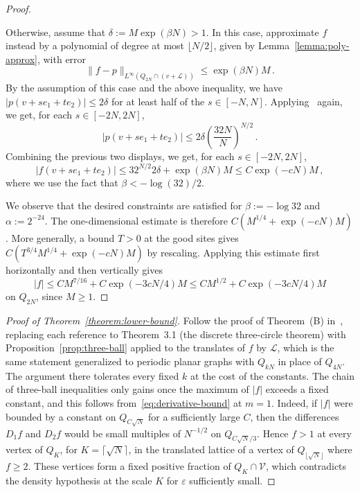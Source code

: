 \documentclass{daj}
\newcommand{\V}{\mathcal{V}}
\newcommand{\eps}{\varepsilon}
\begin{document}
\begin{proof}
\begin{enumerate}
		Otherwise, assume that $\delta := M\exp(\beta N) > 1$. In this case, approximate $f$ instead by a polynomial of degree at most $\lfloor N/2\rfloor$, given by Lemma~\ref{lemma:poly-approx}, with error
		\begin{equation*}
			\|f-p\|_{L^\infty(Q_{2N} \cap (v + \mathcal{L}))} \leq \exp(\beta N)M \, .
		\end{equation*}
		By the assumption of this case and the above inequality, we have $|p(v + se_1 + te_2)| \leq 2\delta$ for at least half of the $s \in [-N, N]$. Applying~\cite[Corollary~2.2]{buhovsky2022discrete} again, we get, for each $s \in [-2N, 2N]$,
		\begin{equation*}
			|p(v + se_1 + te_2)| \leq 2\delta {\left(\frac{32N}{N}\right)}^{N/2} \, .
		\end{equation*}
		Combining the previous two displays, we get, for each $s \in [-2N, 2N]$,
		\[
		|f(v + se_1 + te_2)| \leq {32}^{N/2}2\delta + \exp(\beta N)M \leq C\exp(-cN)M \, ,
		\]
		where we use the fact that $\beta < -\log(32)/2$.
	\end{enumerate}
	We observe that the desired constraints are satisfied for $\beta:=-\log32$ and $\alpha:=2^{-24}$. The one-dimensional estimate is therefore $C(M^{1/4}+\exp(-cN)M)$. More generally, a bound $T>0$ at the good sites gives $C(T^{3/4}M^{1/4}+\exp(-cN)M)$ by rescaling. Applying this estimate first horizontally and then vertically gives
	\[
	|f|\leq C M^{7/16}+C\exp(-3cN/4)M\leq C M^{1/2}+C\exp(-3cN/4)M
	\]
	on $Q_{2N}$, since $M\geq1$.
\end{proof}

\begin{proof}[Proof of Theorem~\ref{theorem:lower-bound}]
	Follow the proof of Theorem~(B) in~\cite{buhovsky2022discrete}, replacing each reference to Theorem~3.1 (the discrete three-circle theorem) with Proposition~\ref{prop:three-ball} applied to the translates of $f$ by $\mathcal{L}$, which is the same statement generalized to periodic planar graphs with $Q_{kN}$ in place of $Q_{4N}$. The argument there tolerates every fixed $k$ at the cost of the constants. The chain of three-ball inequalities only gains once the maximum of $|f|$ exceeds a fixed constant, and this follows from~\eqref{eq:derivative-bound} at $m=1$. Indeed, if $|f|$ were bounded by a constant on $Q_{C\sqrt{N}}$ for a sufficiently large $C$, then the differences $D_1f$ and $D_2f$ would be small multiples of $N^{-1/2}$ on $Q_{C\sqrt{N}/3}$. Hence $f>1$ at every vertex of $Q_{K}$, for $K=\lceil\sqrt{N}\rceil$, in the translated lattice of a vertex of $Q_{\lfloor\sqrt{N}\rfloor}$ where $f\geq2$. These vertices form a fixed positive fraction of $Q_K\cap\V$, which contradicts the density hypothesis at the scale $K$ for $\eps$ sufficiently small.
\end{proof}
\end{document}
